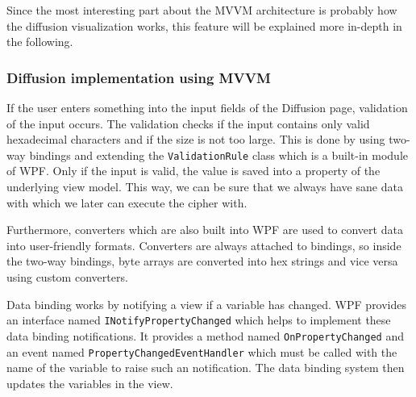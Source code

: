 Since the most interesting part about the MVVM architecture is probably how the diffusion visualization works, this feature will be explained more in-depth in the following.

\subsubsection{Diffusion implementation using MVVM}

If the user enters something into the input fields of the Diffusion page, validation of the input occurs. The validation checks if the input contains only valid hexadecimal characters and if the size is not too large. This is done by using two-way bindings and extending the \texttt{ValidationRule} class which is a built-in module of WPF. Only if the input is valid, the value is saved into a property of the underlying view model. This way, we can be sure that we always have sane data with which we later can execute the cipher with.

Furthermore, converters which are also built into WPF are used to convert data into user-friendly formats. Converters are always attached to bindings, so inside the two-way bindings, byte arrays are converted into hex strings and vice versa using custom converters.

Data binding works by notifying a view if a variable has changed. WPF provides an interface named \texttt{INotifyPropertyChanged} which helps to implement these data binding notifications. It provides a method named \texttt{OnPropertyChanged} and an event named \texttt{PropertyChangedEventHandler} which must be called with the name of the variable to raise such an notification. The data binding system then updates the variables in the view.

